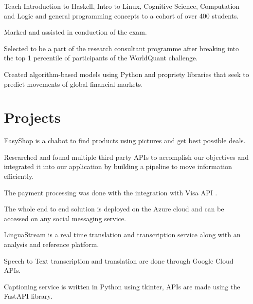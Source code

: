 \documentclass[]{deedy-resume-openfont}
\begin{document}
\begin{minipage}[t]{0.66\textwidth}
\begin{tightemize}
\item Teach Introduction to Haskell, Intro to Linux, Cognitive Science, Computation and Logic and general programming concepts to a cohort of over 400 students.
\item Marked and assisted in conduction of the exam. 
\end{tightemize}
\sectionsep

\begin{tightemize}
\item Selected to be a part of the research consultant programme after breaking into the top 1 percentile of participants of the WorldQuant challenge.
\item Created algorithm-based models using Python and propriety libraries that seek to predict movements of global financial markets.
\end{tightemize}
\sectionsep




\section{Projects}
\begin{tightemize}
\item EasyShop is a chabot to find products using pictures and get best possible deals.
\item Researched and found multiple third party APIs to accomplish our objectives and integrated it into our application by building a pipeline to move information efficiently.
\item The payment processing was done with the integration with Visa API .
\item The whole end to end solution is deployed on the Azure cloud and can be accessed on any social messaging service. 
\end{tightemize}
\sectionsep

\begin{tightemize}
\item LinguaStream is a real time translation and transcription service along with an analysis and reference platform.
\item Speech to Text transcription and translation are done through Google Cloud APIs.
\item Captioning service is written in Python using tkinter, APIs are made using the FastAPI library.
\end{tightemize}
\sectionsep



\end{minipage}
\end{document}
